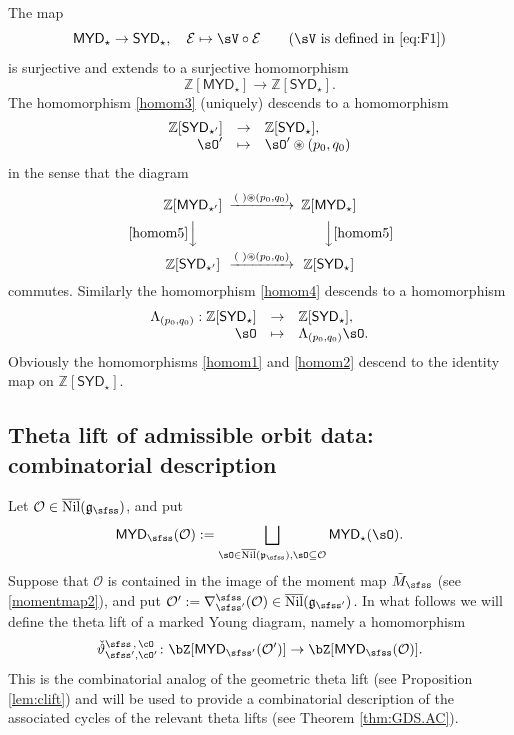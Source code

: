 \documentclass[11pt,a4paper]{amsart}
\def\SYD{{\mathsf{SYD}}}
\def\MYD{{\mathsf{MYD}}}
\newcommand{\CE}{{\mathcal {E}}}
\newcommand{\CO}{{\mathcal {O}}}
\newcommand{\g}{\mathfrak g}
\newcommand{\p}{\mathfrak p}
\newcommand{\Z}{\mathbb{Z}}
\newcommand{\be}{\begin {equation}}
\newcommand{\ee}{\end {equation}}
\numberwithin{equation}{section}
\theoremstyle{remark}
\def\subset{\subseteq}
\def\Nil{\overline{\mathrm{Nil}}}
\def\SYD{{\mathsf{SYD}}}
\def\MYD{{\mathsf{MYD}}}
\begin{document}
The map 
\[
  \MYD_{\star}\rightarrow \SYD_\star, \quad \CE\mapsto \sV\circ \CE \qquad (\text{$\sV$ is defined in \eqref{eq:F1}})
\]
is surjective  and extends to a surjective homomorphism
\be\label{homom5}
\Z[\MYD_{\star}]\rightarrow \Z[\SYD_\star].
\ee
The homomorphism \eqref{homom3} (uniquely) descends to a homomorphism 
\be\label{homom6}
\begin{array}{rcl}
  \Z[\SYD_{\star'}]&\rightarrow&\Z[\SYD_{\star}], \\
   \sO'&\mapsto &\sO' \circledast (p_0,q_0)
   \end{array}
\ee
in the sense that the diagram 
\[
 \begin{CD}
       \Z[\MYD_{\star'}]
                  @>(\,\,) \circledast (p_0,q_0) >>  \Z[\MYD_{\star}]\\
            @V \eqref{homom5}   VV         @ VV  \eqref{homom5}  V \\
      \Z[\SYD_{\star'}]
                  @> (\,\,) \circledast (p_0,q_0) >>  \Z[\SYD_{\star}]\\
  \end{CD}
\]
commutes. Similarly the homomorphism \eqref{homom4} descends to a homomorphism 
\be\label{homom7}
\begin{array}{rcl}
  \Lambda_{(p_0,q_0)}: \Z[\SYD_{\star}]&\rightarrow&\Z[\SYD_{\star}], \\
   \sO&\mapsto & \Lambda_{(p_0,q_0)} \sO.
   \end{array}
\ee
Obviously the homomorphisms \eqref{homom1} and \eqref{homom2} descend to the identity map on  $\Z[\SYD_{\star}]$.

\subsection{Theta lift of admissible orbit data: combinatorial description}


\def\cEp{\cE'}
\def\dliftso{{\check \vartheta}_{\sfss',\cO'}^{\sfss\,,\,\cO}}

Let $\CO\in \Nil(\g_\sfss)$, and put 
\be\label{MYDs}
  \MYD_\sfss(\CO):=\bigsqcup_{\sO\in \Nil(\p_\sfss), \sO\subset \CO}  \MYD_\star(\sO). 
  \ee
  Suppose that $\CO$ is contained in the image of the moment map $\tilde M_{\sfss}$ (see \eqref{momentmap2}), and put $\CO':=\nabla_{\sfss'}^\sfss(\CO)\in \Nil(\g_{\sfss'})$. 
In what follows we will define the theta lift of a marked Young diagram, namely a homomorphism
\[
  \dliftso \colon \bZ[\MYD_{\sfss'}(\CO')]\rightarrow \bZ[\MYD_\sfss(\CO)].
\]  
This is the combinatorial analog of the geometric theta lift (see Proposition \ref{lem:clift}) 
and will be used to provide a combinatorial description of the associated cycles of the relevant theta lifts (see Theorem \ref{thm:GDS.AC}).
\end{document}
